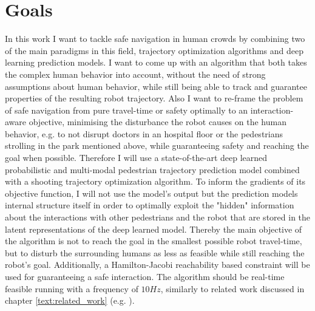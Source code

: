 \section{Goals}
\label{text:introduction/goals}
In this work I want to tackle safe navigation in human crowds by combining two of the main paradigms in this field, trajectory optimization algorithms and deep learning prediction models. I want to come up with an algorithm that both takes the complex human behavior into account, without the need of strong assumptions about human behavior, while still being able to track and guarantee properties of the resulting robot trajectory. Also I want to re-frame the problem of safe navigation from pure travel-time or safety optimally to an interaction-aware objective, minimising the disturbance the robot causes on the human behavior, e.g. to not disrupt doctors in an hospital floor or the pedestrians strolling in the park mentioned above, while guaranteeing safety and reaching the goal when possible.
\newline
Therefore I will use a state-of-the-art deep learned probabilistic and multi-modal pedestrian trajectory prediction model combined with a shooting trajectory optimization algorithm. To inform the gradients of its objective function, I will not use the model's output but the prediction models internal structure itself in order to optimally exploit the "hidden" information about the interactions with other pedestrians and the robot that are stored in the latent representations of the deep learned model. Thereby the main objective of the algorithm is not to reach the goal in the smallest possible robot travel-time, but to disturb the surrounding humans as less as feasible while still reaching the robot's goal. Additionally, a Hamilton-Jacobi reachability based constraint will be used for guaranteeing a safe interaction. The algorithm should be real-time feasible running with a frequency of $10 Hz$, similarly to related work discussed in chapter \ref{text:related_work} (e.g. \cite{Chen2017}).


